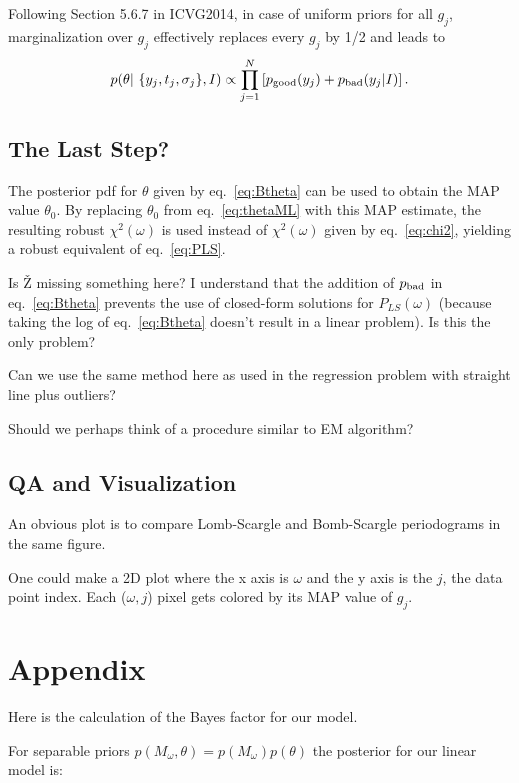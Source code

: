 \documentclass[12pt,pdftex]{article}
\begin{document}
Following Section 5.6.7 in ICVG2014, in case of uniform priors for all $g_j$, marginalization over
$g_j$ effectively replaces every $g_j$ by 1/2 and leads to 
\begin{equation}
\label{eq:Btheta}
   p(\theta|~\{y_j, t_j, \sigma_j\}, I) \propto \prod_{j=1}^{N} \left[ p_{\rm good}(y_j)  + p_{\rm bad}(y_j|I) \right]. 
\end{equation}



\subsection{The Last Step?}

The posterior pdf for $\theta$ given by eq.~\ref{eq:Btheta} can be used to obtain the MAP value $\theta_0$.
By replacing $\theta_0$ from eq.~\ref{eq:thetaML} with this MAP estimate, the resulting robust 
$\chi^2(\omega)$ is used instead of $\chi^2(\omega)$ given by eq.~\ref{eq:chi2}, yielding a robust equivalent
of eq.~\ref{eq:PLS}. 

Is \v{Z} missing something here? I understand that the addition of $p_{\rm bad}$ in eq.~\ref{eq:Btheta}
prevents the use of closed-form solutions for $P_{LS}(\omega)$ (because taking the log of eq.~\ref{eq:Btheta} 
doesn't result in a linear problem). Is this the only problem? 

Can we use the same method here as used in the regression problem with straight line plus outliers? 

Should we perhaps think of a procedure similar to EM algorithm? 

 

\subsection{QA and Visualization} 

An obvious plot is to compare Lomb-Scargle and Bomb-Scargle periodograms in the same figure. 

One could make a 2D plot where the x axis is $\omega$ and the y axis is the $j$, the data point index.
Each ($\omega, j$) pixel gets colored by its MAP value of $g_j$. 

\section{Appendix}
Here is the calculation of the Bayes factor for our model.

For separable priors $p(M_\omega,\theta) = p(M_\omega)p(\theta)$ the posterior for our linear model is:
\end{document}
